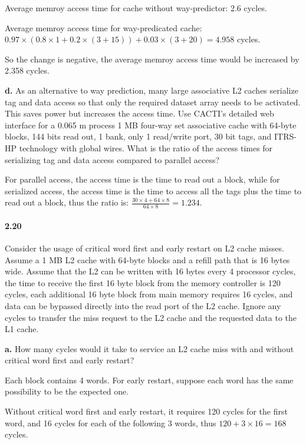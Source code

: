 \documentclass{article}
\begin{document}
Average memroy access time for cache without way-predictor: 2.6 cycles.

Average memroy access time for way-predicated cache: $0.97\times(0.8\times1+0.2\times(3+15))+0.03\times(3+20)=4.958$ cycles.

So the change is negative, the average memroy access time would be increased by 2.358 cycles.

\textbf{d.} As an alternative to way prediction, many large associative L2 caches serialize tag and data access so that only the required dataset array needs to be activated. This saves power but increases the access time. Use CACTI’s detailed web interface for a 0.065 m process 1 MB four-way set associative cache with 64-byte blocks, 144 bits read out, 1 bank, only 1 read/write port, 30 bit tags, and ITRS-HP technology with global wires. What is the ratio of the access times for serializing tag and data access compared to parallel access?

For parallel access, the access time is the time to read out a block, while for serialized access, the access time is the time to access all the tags plus the time to read out a block, thus the ratio is: $\frac{30\times4+64\times8}{64\times8}=1.234$.

\paragraph{2.20} Consider the usage of critical word first and early restart on L2 cache misses. Assume a 1 MB L2 cache with 64-byte blocks and a refill path that is 16 bytes wide. Assume that the L2 can be written with 16 bytes every 4 processor cycles, the time to receive the first 16 byte block from the memory controller is 120 cycles, each additional 16 byte block from main memory requires 16 cycles, and data can be bypassed directly into the read port of the L2 cache. Ignore any cycles to transfer the miss request to the L2 cache and the requested data to the L1 cache.

\textbf{a.} How many cycles would it take to service an L2 cache miss with and without critical word first and early restart?

Each block contains 4 words. For early restart, suppose each word has the same possibility to be the expected one.

Without critical word first and early restart, it requires 120 cycles for the first word, and 16 cycles for each of the following 3 words, thus $120+3\times16=168$ cycles.
\end{document}
